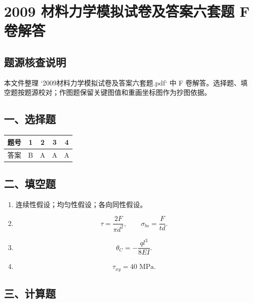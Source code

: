 \documentclass[11pt,a4paper]{ctexrep}
\newcommand{\assetdir}{}
\begin{document}
\chapter{2009 材料力学模拟试卷及答案六套题 F 卷解答}
{
\renewcommand{\assetdir}{../../考题_按知识点整理/visual_assets/question_crops/2009_2009材料力学模拟试卷及答案六套题}


\vspace{-1.0cm}

\section*{题源核查说明}

本文件整理 `2009材料力学模拟试卷及答案六套题.pdf` 中 F 卷解答。选择题、填空题按题源校对；作图题保留关键图值和重画坐标图作为抄图依据。

\section*{一、选择题}

\begin{center}
\begin{tabular}{c c c c c}
\toprule
题号 & 1 & 2 & 3 & 4\\
\midrule
答案 & B & A & A & A\\
\bottomrule
\end{tabular}
\end{center}

\section*{二、填空题}

\begin{enumerate}
    \item 连续性假设；均匀性假设；各向同性假设。

    \item
    \[
        \tau=\frac{2F}{\pi d^2},
        \qquad
        \sigma_{bs}=\frac{F}{td}.
    \]

    \item
    \[
        \theta_C=-\frac{q l^3}{8EI}.
    \]

    \item
    \[
        \tau_{xy}=40\text{ MPa}.
    \]
\end{enumerate}

\section*{三、计算题}

}
\end{document}
